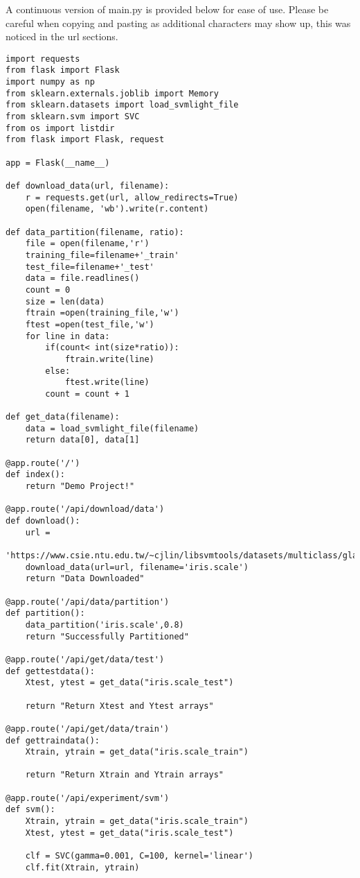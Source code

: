 A continuous version of main.py is provided below for ease of
use. Please be careful when copying and pasting as additional
characters may show up, this was noticed in the url sections. 

\begin{lstlisting}
import requests
from flask import Flask
import numpy as np
from sklearn.externals.joblib import Memory
from sklearn.datasets import load_svmlight_file
from sklearn.svm import SVC
from os import listdir
from flask import Flask, request

app = Flask(__name__)

def download_data(url, filename):
    r = requests.get(url, allow_redirects=True)
    open(filename, 'wb').write(r.content)

def data_partition(filename, ratio):
    file = open(filename,'r')
    training_file=filename+'_train'
    test_file=filename+'_test'
    data = file.readlines()
    count = 0
    size = len(data)
    ftrain =open(training_file,'w')
    ftest =open(test_file,'w')
    for line in data:
        if(count< int(size*ratio)):
            ftrain.write(line)
        else:
            ftest.write(line)
        count = count + 1        

def get_data(filename):
    data = load_svmlight_file(filename)
    return data[0], data[1]

@app.route('/')
def index():
    return "Demo Project!"

@app.route('/api/download/data')
def download():
    url =
    'https://www.csie.ntu.edu.tw/~cjlin/libsvmtools/datasets/multiclass/glass.scale'
    download_data(url=url, filename='iris.scale')
    return "Data Downloaded"

@app.route('/api/data/partition')
def partition():
    data_partition('iris.scale',0.8)
    return "Successfully Partitioned"

@app.route('/api/get/data/test')
def gettestdata():
    Xtest, ytest = get_data("iris.scale_test")
    
    return "Return Xtest and Ytest arrays"

@app.route('/api/get/data/train')
def gettraindata():
    Xtrain, ytrain = get_data("iris.scale_train")
    
    return "Return Xtrain and Ytrain arrays"

@app.route('/api/experiment/svm')
def svm():
    Xtrain, ytrain = get_data("iris.scale_train")
    Xtest, ytest = get_data("iris.scale_test")

    clf = SVC(gamma=0.001, C=100, kernel='linear')
    clf.fit(Xtrain, ytrain)


\end{lstlisting}
